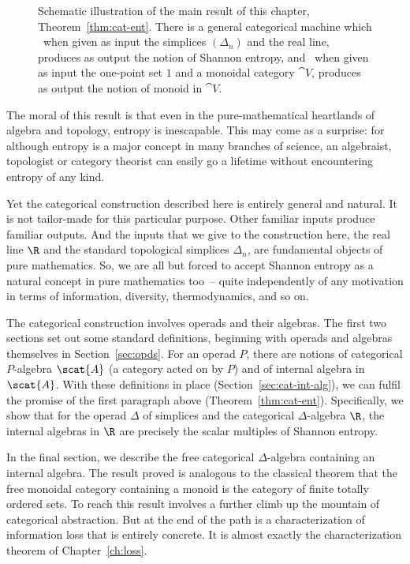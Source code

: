 \begin{figure}
\begin{picture}
\end{picture}%
\caption{Schematic illustration of the main result of this chapter,
  Theorem~\ref{thm:cat-ent}.  There is a general categorical machine
  which ~when given as input the simplices $(\Delta_n)$ and
  the real line, produces as output the notion of Shannon entropy, and
  ~when given as input the one-point set $1$ and a monoidal
  category $\cat{V}$, produces as output the notion of monoid in $\cat{V}$.}
\end{figure}

The moral of this result is that even in the pure-mathematical heartlands
of algebra and topology, entropy is inescapable.%
%
% 
This may come as a surprise: for although entropy is a major concept in
many branches of science, an algebraist, topologist or category
theorist can easily go a lifetime without encountering entropy of any
kind.

Yet the categorical construction described here is entirely general and
natural.  It is not tailor-made for this particular purpose.  Other
familiar inputs produce familiar outputs.  And the inputs that we give to
the construction here, the real line $\R$ and the standard topological
simplices $\Delta_n$, are fundamental objects of pure mathematics.  So, we
are all but forced to accept Shannon entropy as a natural concept in
pure mathematics too~-- quite independently of any motivation in terms of
information, diversity, thermodynamics, and so on.

The categorical construction involves operads and their algebras.  The
first two sections set out some standard definitions, beginning
with operads and algebras themselves in Section~\ref{sec:opds}.  For an
operad $P$, there are notions of categorical $P$-algebra $\scat{A}$ (a
category acted on by $P$) and of internal algebra in $\scat{A}$.  With
these definitions in place (Section~\ref{sec:cat-int-alg}), we can fulfil
the promise of the first paragraph above (Theorem~\ref{thm:cat-ent}).
Specifically, we show that for the operad $\Delta$ of simplices and the
categorical $\Delta$-algebra $\R$, the internal algebras in $\R$ are
precisely the scalar multiples of Shannon entropy.

In the final section, we describe the free categorical $\Delta$-algebra
containing an internal algebra.  The result proved is analogous to the
classical theorem that the free monoidal category containing a monoid is
the category of finite totally ordered sets.  To reach this result involves
a further climb up the mountain of categorical abstraction.  But at the end
of the path is a characterization of information loss that is entirely
concrete. It is almost exactly the characterization theorem of
Chapter~\ref{ch:loss}.

